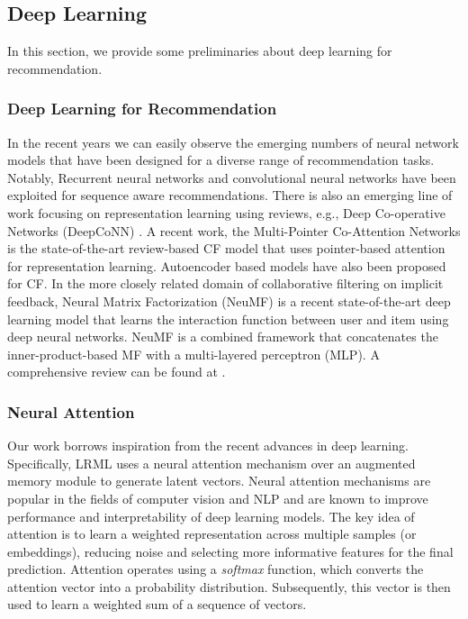 \documentclass[sigconf]{acmart}
\begin{document}
\subsection{Deep Learning}
In this section, we provide some preliminaries about deep learning for recommendation. 
\subsubsection{Deep Learning for Recommendation}
 In the recent years we can easily observe the emerging numbers of neural network models that have been designed for a diverse range of recommendation tasks. Notably, Recurrent neural networks \cite{DBLP:conf/wsdm/WuABSJ17} and convolutional neural networks \cite{Tang:2018:PTS:3159652.3159656} have been exploited for sequence aware recommendations. There is also an emerging line of work focusing on representation learning using reviews, e.g., Deep Co-operative Networks (DeepCoNN) \cite{DBLP:conf/wsdm/ZhengNY17}. A recent work, the Multi-Pointer Co-Attention Networks \cite{DBLP:journals/corr/abs-1801-09251} is the state-of-the-art review-based CF model that uses pointer-based attention for representation learning. Autoencoder based models \cite{DBLP:conf/kdd/LiS17,Zhang:2017:AEH:3077136.3080689} have also been proposed for CF. In the more closely related domain of collaborative filtering on implicit feedback, Neural Matrix Factorization (NeuMF) \cite{He:2017:NCF:3038912.3052569} is a recent state-of-the-art deep learning model that learns the interaction function between user and item using deep neural networks. NeuMF is a combined framework that concatenates the inner-product-based MF with a multi-layered perceptron (MLP). A comprehensive review can be found at \cite{zhang2017deep}.

 \subsubsection{Neural Attention} 
 Our work borrows inspiration from the recent advances in deep learning. Specifically, \textsc{LRML} uses a neural attention mechanism over an augmented memory module to generate latent vectors. Neural attention mechanisms are popular in the fields of computer vision \cite{DBLP:conf/nips/MnihHGK14,DBLP:conf/icml/XuBKCCSZB15} and NLP \cite{rocktaschel2015reasoning,luong2015effective,1712.05403,DBLP:conf/cikm/PhanSTHL17,DBLP:journals/corr/abs-1801-00102} and are known to improve performance and interpretability of deep learning models. The key idea of attention is to learn a weighted representation across multiple samples (or embeddings), reducing noise and selecting more informative features for the final prediction. Attention operates using a \textit{softmax} function, which converts the attention vector into a probability distribution. Subsequently, this vector is then used to learn a weighted sum of a sequence of vectors. 
\end{document}
